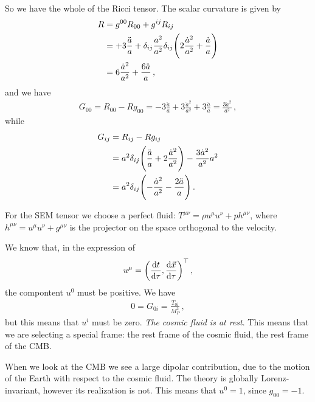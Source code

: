 \documentclass[main.tex]{subfiles}
\begin{document}
So we have the whole of the Ricci tensor. 
The scalar curvature is given by 
%
\begin{subequations}
\begin{align}
  R &= g^{00} R_{00} + g^{ij} R_{ij}  \\
  &= + 3 \frac{\ddot{a}}{a} + \delta_{ij} \frac{a^2}{a^2} \delta_{ij}  \qty( 2 \frac{\dot{a}^2}{a^2} + \frac{\dot{a}}{a})  \\
  &= 6 \frac{\dot{a}^2}{a^2} + \frac{6 \ddot{a}}{a}
\,,
\end{align}
\end{subequations}
%
and we have 
%
\begin{align}
  G_{00 } = R_{00} - R g_{00} = - 3\frac{\ddot{a}}{a}
  + 3 \frac{\dot{a}^2}{a^2} + 3 \frac{\ddot{a}}{a} = \frac{3 \dot{a}^2}{a^2}
\,,
\end{align}
%
while 
%
\begin{subequations}
\begin{align}
  G_{ij} &= R_{ij} - Rg_{ij} \\
  &= a^2 \delta_{ij} \qty(\frac{\ddot{a}}{a} + 2 \frac{\dot{a}^2}{a^2}) - \frac{3 \dot{a}^2}{a^2} a^2  \\
  &= a^2 \delta_{ij} \qty(- \frac{\dot{a}^2}{a^2} - \frac{2 \ddot{a}}{a})
\,.
\end{align}
\end{subequations}

For the SEM tensor we choose a perfect fluid: \(T^{\mu \nu } = \rho u^{\mu } u^{\nu }  + p h^{ \mu \nu }\), where \(h^{\mu \nu } = u^{ \mu }  u^{\nu } + g^{ \mu \nu }\) is the projector on the space orthogonal to the velocity. 

We know that, in the expression of 
%
\begin{align}
  u^{\mu } = \qty(\dv{t}{\tau }, \dv{\vec{x}}{\tau })^{\top}
\,,
\end{align}
%
the compontent \(u^{0}\) must be positive. We have 
%
\begin{align}
  0 = G_{0i} = \frac{T_{0i} }{M_P^2}
\,,
\end{align}
%
but this means that \(u^{i}\) must be zero. \emph{The cosmic fluid is at rest}. This means that we are selecting a special frame: the rest frame of the cosmic fluid, the rest frame of the CMB. 

When we look at the CMB we see a large dipolar contribution, due to the motion of the Earth with respect to the cosmic fluid. 
The theory is globally Lorenz-invariant, however its realization is not. This means that \(u^{0} = 1\), since \(g_{00} = -1\). 
\end{document}
